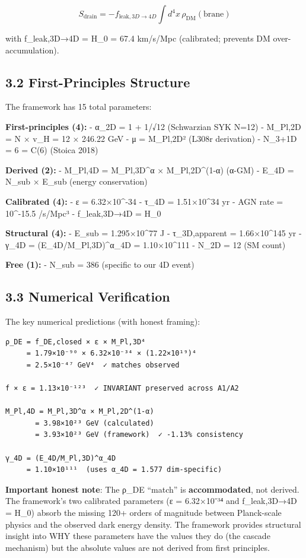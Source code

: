 \[S_\text{drain} = -f_{\text{leak},3D\to4D} \int d^4x \, \rho_\text{DM}(\text{brane})\]

with f\_leak,3D→4D = H\_0 = 67.4 km/s/Mpc (calibrated; prevents DM
over-accumulation).

\hypertarget{first-principles-structure}{%
\subsection{3.2 First-Principles
Structure}\label{first-principles-structure}}

The framework has 15 total parameters:

\textbf{First-principles (4):} - α\_2D = 1 + 1/√12 (Schwarzian SYK N=12)
- M\_Pl,2D = N × v\_H = 12 × 246.22 GeV - μ = M\_Pl,2D² (L308r
derivation) - N\_3+1D = 6 = C(6) (Stoica 2018)

\textbf{Derived (2):} - M\_Pl,4D = M\_Pl,3D\^{}α × M\_Pl,2D\^{}(1-α)
(α-GM) - E\_4D = N\_sub × E\_sub (energy conservation)

\textbf{Calibrated (4):} - ε = 6.32×10\^{}-34 - τ\_4D = 1.51×10\^{}34 yr
- AGN rate = 10\^{}-15.5 /s/Mpc³ - f\_leak,3D→4D = H\_0

\textbf{Structural (4):} - E\_sub = 1.295×10\^{}77 J - τ\_3D,apparent =
1.66×10\^{}145 yr - γ\_4D = (E\_4D/M\_Pl,3D)\^{}α\_4D = 1.10×10\^{}111 -
N\_2D = 12 (SM count)

\textbf{Free (1):} - N\_sub = 386 (specific to our 4D event)

\hypertarget{numerical-verification}{%
\subsection{3.3 Numerical Verification}\label{numerical-verification}}

The key numerical predictions (with honest framing):

\begin{verbatim}
ρ_DE = f_DE,closed × ε × M_Pl,3D⁴
     = 1.79×10⁻⁹⁰ × 6.32×10⁻³⁴ × (1.22×10¹⁹)⁴
     = 2.5×10⁻⁴⁷ GeV⁴  ✓ matches observed

f × ε = 1.13×10⁻¹²³  ✓ INVARIANT preserved across A1/A2

M_Pl,4D = M_Pl,3D^α × M_Pl,2D^(1-α)
       = 3.98×10²³ GeV (calculated)
       = 3.93×10²³ GeV (framework)  ✓ -1.13% consistency

γ_4D = (E_4D/M_Pl,3D)^α_4D
     = 1.10×10¹¹¹  (uses α_4D = 1.577 dim-specific)
\end{verbatim}

\textbf{Important honest note}: The ρ\_DE ``match'' is
\textbf{accommodated}, not derived. The framework's two calibrated
parameters (ε = 6.32×10⁻³⁴ and f\_leak,3D→4D = H\_0) absorb the missing
120+ orders of magnitude between Planck-scale physics and the observed
dark energy density. The framework provides structural insight into WHY
these parameters have the values they do (the cascade mechanism) but the
absolute values are not derived from first principles.

